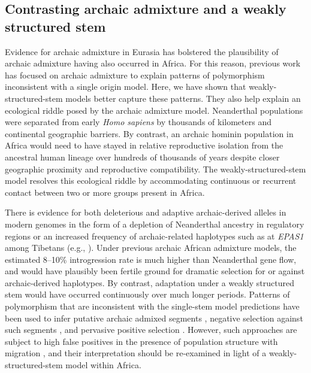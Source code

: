 \documentclass[]{article}
\begin{document}
\subsection*{Contrasting archaic admixture and a weakly structured stem}

Evidence for archaic admixture in Eurasia has bolstered the plausibility of
archaic admixture having also occurred in Africa. For this reason, previous
work has focused on archaic admixture to explain patterns of polymorphism
inconsistent with a single origin model. Here, we have shown that
weakly-structured-stem models better capture these patterns.
They also help explain an
ecological riddle posed by the archaic admixture model. Neanderthal populations
were separated from early \emph{Homo sapiens} by thousands of kilometers and
continental geographic barriers. By contrast, an archaic hominin population in
Africa would need to have stayed in relative reproductive isolation from the
ancestral human lineage over hundreds of thousands of years despite closer geographic
proximity and reproductive compatibility. The weakly-structured-stem model
resolves this ecological riddle by accommodating continuous or recurrent
contact between two or more groups present in Africa.

There is evidence for both deleterious and adaptive archaic-derived alleles in
modern genomes in the form of a depletion of Neanderthal ancestry in regulatory
regions \citep{Petr2019-xo} or an increased frequency of archaic-related
haplotypes such as at \emph{EPAS1} among Tibetans (e.g.,
\citet{Zhang2021-xx}). Under previous
archaic African admixture models, the estimated 8--10\% introgression rate is
much higher than Neanderthal gene flow, and would have plausibly been fertile
ground for dramatic selection for or against archaic-derived haplotypes\citep{Wall2019-ao}. By contrast, adaptation under a weakly
structured stem would have occurred continuously over much longer periods.
Patterns of polymorphism that are inconsistent with the single-stem model
predictions have been used to infer putative archaic admixed segments
\citep{Plagnol2006-lt,Hsieh2016-gk,Wall2019-ao,Durvasula2020-td}, negative
selection against such segments \citep{Wall2019-ao}, and pervasive positive
selection \citep{Schrider2017-kl}. However, such approaches are subject to high
false positives in the presence of population structure with migration
\citep{Petr2019-xo}, and their interpretation should be re-examined in light of
a weakly-structured-stem model within Africa.
\end{document}
